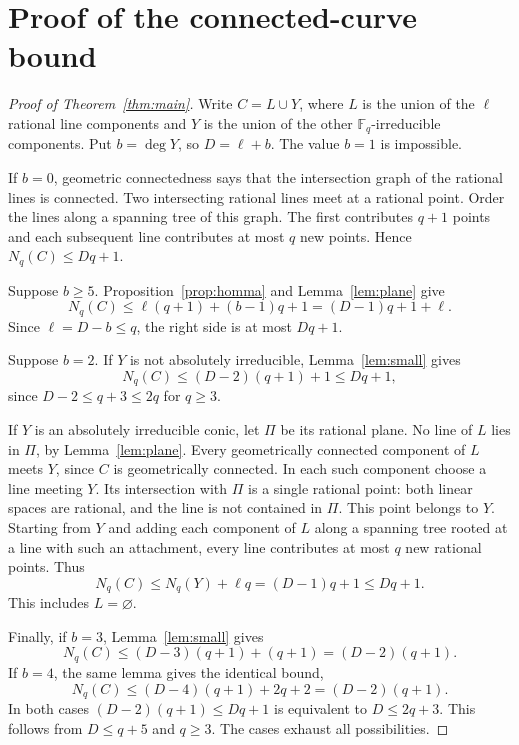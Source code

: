 \documentclass[11pt]{article}
\theoremstyle{remark}\newtheorem{remark}[theorem]{Remark}
\newcommand{\F}{\mathbb F}
\newcommand{\Nq}{N_q}
\begin{document}
\section{Proof of the connected-curve bound}
\begin{proof}[Proof of Theorem~\ref{thm:main}]
Write $C=L\cup Y$, where $L$ is the union of the $\ell$ rational line components and $Y$ is the union of the other $\F_q$-irreducible components. Put $b=\deg Y$, so $D=\ell+b$. The value $b=1$ is impossible.

If $b=0$, geometric connectedness says that the intersection graph of the rational lines is connected. Two intersecting rational lines meet at a rational point. Order the lines along a spanning tree of this graph. The first contributes $q+1$ points and each subsequent line contributes at most $q$ new points. Hence $\Nq(C)\le Dq+1$.

Suppose $b\ge5$. Proposition~\ref{prop:homma} and Lemma~\ref{lem:plane} give
\[
 \Nq(C)\le\ell(q+1)+(b-1)q+1
             =(D-1)q+1+\ell.
\]
Since $\ell=D-b\le q$, the right side is at most $Dq+1$.

Suppose $b=2$. If $Y$ is not absolutely irreducible, Lemma~\ref{lem:small} gives
\[
 \Nq(C)\le(D-2)(q+1)+1\le Dq+1,
\]
since $D-2\le q+3\le2q$ for $q\ge3$.

If $Y$ is an absolutely irreducible conic, let $\Pi$ be its rational plane. No line of $L$ lies in $\Pi$, by Lemma~\ref{lem:plane}. Every geometrically connected component of $L$ meets $Y$, since $C$ is geometrically connected. In each such component choose a line meeting $Y$. Its intersection with $\Pi$ is a single rational point: both linear spaces are rational, and the line is not contained in $\Pi$. This point belongs to $Y$. Starting from $Y$ and adding each component of $L$ along a spanning tree rooted at a line with such an attachment, every line contributes at most $q$ new rational points. Thus
\[
 \Nq(C)\le\Nq(Y)+\ell q=(D-1)q+1\le Dq+1.
\]
This includes $L=\varnothing$.

Finally, if $b=3$, Lemma~\ref{lem:small} gives
\[
 \Nq(C)\le(D-3)(q+1)+(q+1)=(D-2)(q+1).
\]
If $b=4$, the same lemma gives the identical bound,
\[
 \Nq(C)\le(D-4)(q+1)+2q+2=(D-2)(q+1).
\]
In both cases $(D-2)(q+1)\le Dq+1$ is equivalent to $D\le2q+3$. This follows from $D\le q+5$ and $q\ge3$. The cases exhaust all possibilities.
\end{proof}
\end{document}

